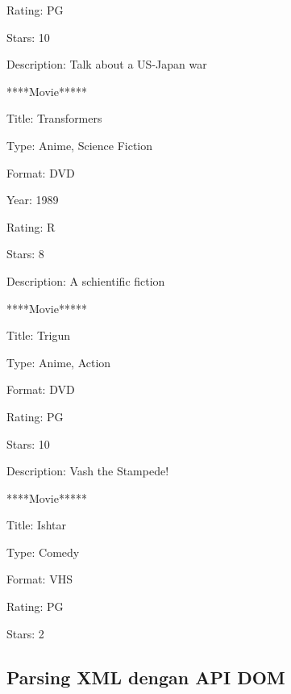 {\fontsize{10pt}{10pt}\selectfont Rating: PG} 
 
{\fontsize{10pt}{10pt}\selectfont Stars: 10} 
 
{\fontsize{10pt}{10pt}\selectfont Description: Talk about a US-Japan war} 
 
{\fontsize{10pt}{10pt}\selectfont *****Movie*****} 
 
{\fontsize{10pt}{10pt}\selectfont Title: Transformers} 
 
{\fontsize{10pt}{10pt}\selectfont Type: Anime, Science Fiction} 
 
{\fontsize{10pt}{10pt}\selectfont Format: DVD} 
 
{\fontsize{10pt}{10pt}\selectfont Year: 1989} 
 
{\fontsize{10pt}{10pt}\selectfont Rating: R} 
 
{\fontsize{10pt}{10pt}\selectfont Stars: 8} 
 
{\fontsize{10pt}{10pt}\selectfont Description: A schientific fiction} 
 
{\fontsize{10pt}{10pt}\selectfont *****Movie*****} 
 
{\fontsize{10pt}{10pt}\selectfont Title: Trigun} 
 
{\fontsize{10pt}{10pt}\selectfont Type: Anime, Action} 
 
{\fontsize{10pt}{10pt}\selectfont Format: DVD} 
 
{\fontsize{10pt}{10pt}\selectfont Rating: PG} 
 
{\fontsize{10pt}{10pt}\selectfont Stars: 10} 
 
{\fontsize{10pt}{10pt}\selectfont Description: Vash the Stampede!} 
 
{\fontsize{10pt}{10pt}\selectfont *****Movie*****} 
 
{\fontsize{10pt}{10pt}\selectfont Title: Ishtar} 
 
{\fontsize{10pt}{10pt}\selectfont Type: Comedy} 
 
{\fontsize{10pt}{10pt}\selectfont Format: VHS} 
 
{\fontsize{10pt}{10pt}\selectfont Rating: PG} 
 
{\fontsize{10pt}{10pt}\selectfont Stars: 2} 
 
\vspace{10pt}
 
\subsection{Parsing XML dengan API DOM} 
 
